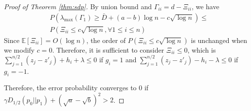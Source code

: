 \documentclass[conference]{IEEEtran}
\begin{document}
\begin{proof}[Proof of Theorem \ref{thm:sdp}]
		By union bound and $\Gamma_{ii} = d - \Xi_{ii}$, we have
		\begin{align*}
		&P(\lambda_{\max}(\Gamma_1) \geq \bar{D}+(a-b)\log n - c\sqrt{\log n})\leq \\
		&P(\Xi_{ii} \leq c\sqrt{\log n}, \forall 1\leq i \leq n)
		\end{align*}
		Since $\mathbb{E}[\Xi_{ii}]=O(\log n)$, the order of $P(\Xi_{ii} \leq c\sqrt{\log n})$ is unchanged when we modify $c=0$. Therefore, it is sufficient to consider $\Xi_{ii} \leq 0 $, which is
		$\sum_{j=1}^{n/2} (z_j - z'_j) + h_i + \lambda \leq 0$ if $g_i=1$ and
		$\sum_{j=1}^{n/2} (z_j - z'_j) - h_i - \lambda \leq 0$ if $g_i = -1$.
	
		Therefore, the error probability converges to 0
		if $\gamma D_{1/2}(p_0||p_1) + (\sqrt{a} - \sqrt{b})^2 > 2$.
		
	\end{proof}
	
	
	
\end{document}
